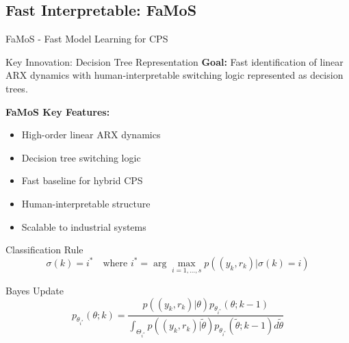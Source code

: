 \documentclass[aspectratio=169]{beamer}
\begin{document}
\subsection{Fast Interpretable: FaMoS}

\begin{frame}{FaMoS - Fast Model Learning for CPS}
\begin{block}{Key Innovation: Decision Tree Representation}
\textbf{Goal:} Fast identification of linear ARX dynamics with human-interpretable switching logic represented as decision trees.
\end{block}

\textbf{FaMoS Key Features:}
\begin{itemize}
\item High-order linear ARX dynamics
\item Decision tree switching logic
\item Fast baseline for hybrid CPS
\item Human-interpretable structure
\item Scalable to industrial systems
\end{itemize}

\begin{block}{Classification Rule}
$$\sigma(k) = i^* \quad \text{where } i^* = \arg\max_{i=1,\ldots,s} p((y_k, r_k) | \sigma(k) = i)$$
\end{block}

\begin{block}{Bayes Update}
$$p_{\theta_{i^*}}(\theta; k) = \frac{p((y_k, r_k) | \theta) p_{\theta_{i^*}}(\theta; k-1)}{\int_{\Theta_{i^*}} p((y_k, r_k) | \tilde{\theta}) p_{\theta_{i^*}}(\tilde{\theta}; k-1) d\tilde{\theta}}$$
\end{block}
\end{frame}
\end{document}
